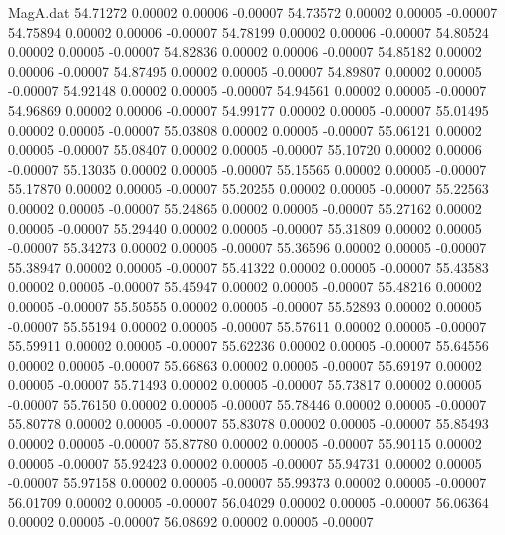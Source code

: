 \begin{filecontents}{MagA.dat}
  54.71272    0.00002    0.00006   -0.00007
  54.73572    0.00002    0.00005   -0.00007
  54.75894    0.00002    0.00006   -0.00007
  54.78199    0.00002    0.00006   -0.00007
  54.80524    0.00002    0.00005   -0.00007
  54.82836    0.00002    0.00006   -0.00007
  54.85182    0.00002    0.00006   -0.00007
  54.87495    0.00002    0.00005   -0.00007
  54.89807    0.00002    0.00005   -0.00007
  54.92148    0.00002    0.00005   -0.00007
  54.94561    0.00002    0.00005   -0.00007
  54.96869    0.00002    0.00006   -0.00007
  54.99177    0.00002    0.00005   -0.00007
  55.01495    0.00002    0.00005   -0.00007
  55.03808    0.00002    0.00005   -0.00007
  55.06121    0.00002    0.00005   -0.00007
  55.08407    0.00002    0.00005   -0.00007
  55.10720    0.00002    0.00006   -0.00007
  55.13035    0.00002    0.00005   -0.00007
  55.15565    0.00002    0.00005   -0.00007
  55.17870    0.00002    0.00005   -0.00007
  55.20255    0.00002    0.00005   -0.00007
  55.22563    0.00002    0.00005   -0.00007
  55.24865    0.00002    0.00005   -0.00007
  55.27162    0.00002    0.00005   -0.00007
  55.29440    0.00002    0.00005   -0.00007
  55.31809    0.00002    0.00005   -0.00007
  55.34273    0.00002    0.00005   -0.00007
  55.36596    0.00002    0.00005   -0.00007
  55.38947    0.00002    0.00005   -0.00007
  55.41322    0.00002    0.00005   -0.00007
  55.43583    0.00002    0.00005   -0.00007
  55.45947    0.00002    0.00005   -0.00007
  55.48216    0.00002    0.00005   -0.00007
  55.50555    0.00002    0.00005   -0.00007
  55.52893    0.00002    0.00005   -0.00007
  55.55194    0.00002    0.00005   -0.00007
  55.57611    0.00002    0.00005   -0.00007
  55.59911    0.00002    0.00005   -0.00007
  55.62236    0.00002    0.00005   -0.00007
  55.64556    0.00002    0.00005   -0.00007
  55.66863    0.00002    0.00005   -0.00007
  55.69197    0.00002    0.00005   -0.00007
  55.71493    0.00002    0.00005   -0.00007
  55.73817    0.00002    0.00005   -0.00007
  55.76150    0.00002    0.00005   -0.00007
  55.78446    0.00002    0.00005   -0.00007
  55.80778    0.00002    0.00005   -0.00007
  55.83078    0.00002    0.00005   -0.00007
  55.85493    0.00002    0.00005   -0.00007
  55.87780    0.00002    0.00005   -0.00007
  55.90115    0.00002    0.00005   -0.00007
  55.92423    0.00002    0.00005   -0.00007
  55.94731    0.00002    0.00005   -0.00007
  55.97158    0.00002    0.00005   -0.00007
  55.99373    0.00002    0.00005   -0.00007
  56.01709    0.00002    0.00005   -0.00007
  56.04029    0.00002    0.00005   -0.00007
  56.06364    0.00002    0.00005   -0.00007
  56.08692    0.00002    0.00005   -0.00007

\end{filecontents}
